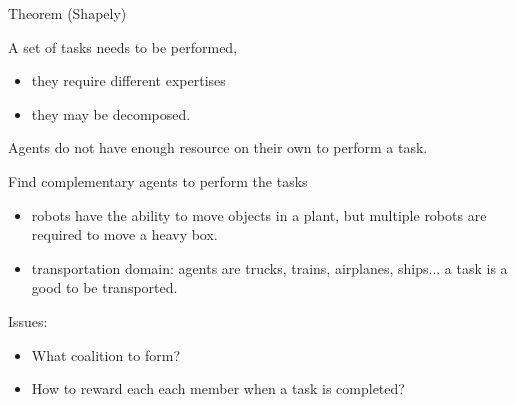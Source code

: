 \documentclass{article}
\begin{document}
Theorem (Shapely) 

\hline 

A set of tasks needs to be performed,
\begin{itemize}
	\item they require different expertises
	\item they may be decomposed.
\end{itemize}

Agents do not have enough resource on their own to perform a task.

Find complementary agents to perform the tasks
\begin{itemize}
	\item robots have the ability to move objects in a plant, but multiple robots are required to move a heavy box.
	\item transportation domain: agents are trucks, trains, airplanes, ships... a task is a good to be transported.
\end{itemize}

Issues:
\begin{itemize}
	\item What coalition to form?
	\item How to reward each each member when a task is completed?
\end{itemize}

\hline 
\end{document}
